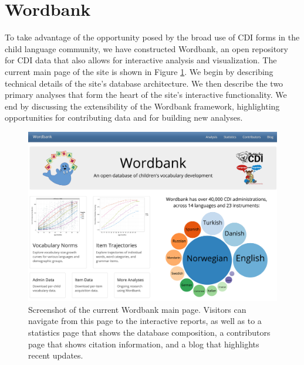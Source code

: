 \documentclass[doc,noapacite]{apa2}
\begin{document}
\section{Wordbank}

To take advantage of the opportunity posed by the broad use of CDI forms in the child language community, we have constructed Wordbank, an open repository for CDI data that also allows for interactive analysis and visualization. The current main page of the site is shown in Figure \ref{fig:screenshot}. We begin by describing technical details of the site's database architecture. We then describe the two primary analyses that form the heart of the site's interactive functionality. We end by discussing the extensibility of the Wordbank framework, highlighting opportunities for contributing data and for building new analyses. 


\begin{figure}[h!]
\includegraphics[width=6.4in]{figures/screenshot.png}
\caption{\label{fig:screenshot} Screenshot of the current Wordbank main page. Visitors can navigate from this page to the interactive reports, as well as to a statistics page that shows the database composition, a contributors page that shows citation information, and a blog that highlights recent updates.}
\end{figure}
\end{document}
